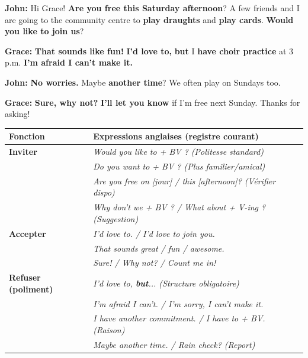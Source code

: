 \documentclass[11pt]{article}
\newcommand{\eng}[1]{\ifmmode\text{\textit{#1}}\else\begingroup\selectlanguage{english}\itshape #1\endgroup\fi}
\begin{document}
\begin{textebox}
\textbf{John:} Hi Grace! \textbf{Are you free this Saturday afternoon}? A few friends and I are going to the community centre to \textbf{play draughts} and \textbf{play cards}. \textbf{Would you like to join us}?

\textbf{Grace:} \textbf{That sounds like fun!} \textbf{I'd love to,} \textbf{but} I \textbf{have choir practice} at 3 p.m. \textbf{I'm afraid I can't make it.}

\textbf{John:} \textbf{No worries.} Maybe \textbf{another time}? We often play on Sundays too.

\textbf{Grace:} \textbf{Sure, why not?} \textbf{I'll let you know} if I'm free next Sunday. Thanks for asking!
\end{textebox}

\begin{propriete}
\begin{center}
\begin{tabularx}{\linewidth}{|X|X|}\hline
\rowcolor{poporangeL} \textbf{Fonction} & \textbf{Expressions anglaises (registre courant)} \\ \hline
\textbf{Inviter} & \eng{Would you like to + BV ?} (Politesse standard) \\
& \eng{Do you want to + BV ?} (Plus familier/amical) \\
& \eng{Are you free on [jour] / this [afternoon]?} (Vérifier dispo) \\
& \eng{Why don't we + BV ?} / \eng{What about + V-ing ?} (Suggestion) \\ \hline
\textbf{Accepter} & \eng{I'd love to.} / \eng{I'd love to join you.} \\
& \eng{That sounds great / fun / awesome.} \\
& \eng{Sure! / Why not? / Count me in!} \\ \hline
\textbf{Refuser (poliment)} & \eng{I'd love to, \textbf{but}...} (Structure obligatoire) \\
& \eng{I'm afraid I can't.} / \eng{I'm sorry, I can't make it.} \\
& \eng{I have another commitment.} / \eng{I have to + BV.} (Raison) \\
& \eng{Maybe another time.} / \eng{Rain check?} (Report) \\ \hline
\end{tabularx}
\end{center}
\end{propriete}
\end{document}
